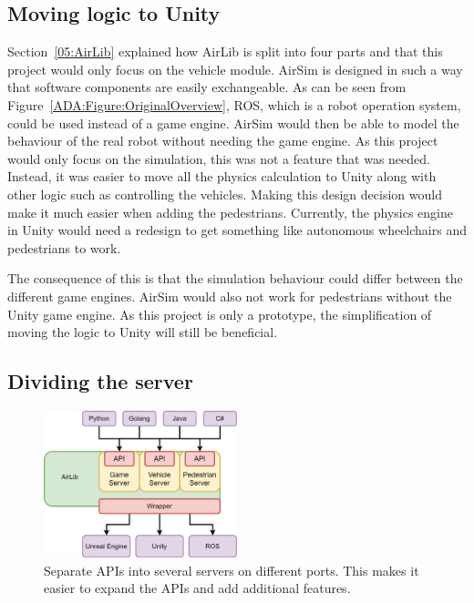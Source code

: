 \subsection{Moving logic to Unity}
Section~\ref{05:AirLib} explained how AirLib is split into four parts and that this project would only focus on the vehicle module. AirSim is designed in such a way that software components are easily exchangeable. As can be seen from Figure~\ref{ADA:Figure:OriginalOverview}, ROS, which is a robot operation system, could be used instead of a game engine. AirSim would then be able to model the behaviour of the real robot without needing the game engine. As this project would only focus on the simulation, this was not a feature that was needed. Instead, it was easier to move all the physics calculation to Unity along with other logic such as controlling the vehicles. Making this design decision would make it much easier when adding the pedestrians. Currently, the physics engine in Unity would need a redesign to get something like autonomous wheelchairs and pedestrians to work.

The consequence of this is that the simulation behaviour could differ between the different game engines. AirSim would also not work for pedestrians without the Unity game engine. As this project is only a prototype, the simplification of moving the logic to Unity will still be beneficial. 

\subsection{Dividing the server}
\begin{figure}[h]
    \centering
    \includegraphics[width=0.5\textwidth]{05_AnalysisAndDesign/Diagrams/UpdatedOverview.png}
    \caption{Separate APIs into several servers on different ports. This makes it easier to expand the APIs and add additional features.}
\end{figure}



